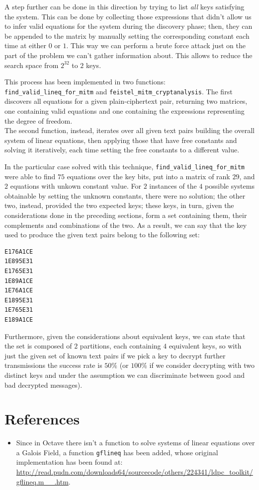 \documentclass[a4paper,12pt,titlepage]{article}
\begin{document}
A step further can be done in this direction by trying to list \emph{all} keys
satisfying the system. This can be done by
collecting those expressions that didn't allow us to infer valid equations for
the system during the discovery phase; then, they can be appended to the matrix by
manually setting the corresponding constant each time at either $0$ or $1$.
This way we can perform a brute force attack just on the part of the problem we
can't gather information about. This allows to reduce the search space from
$2^{32}$ to $2$ keys.

This process has been implemented in two functions:
\texttt{find\_valid\_lineq\_for\_mitm} and \texttt{feistel\_mitm\_cryptanalysis}. The
first discovers all equations for a given plain-ciphertext pair, returning two
matrices, one containing valid equations and one containing the expressions
representing the degree of freedom. \\
The second function, instead, iterates over all given text pairs building the
overall system of linear equations, then applying those that have free
constants and solving it iteratively, each time setting the free constants to a
different value.

In the particular case solved with this technique,
\texttt{find\_valid\_lineq\_for\_mitm} were able to find $75$ equations over the
key bits, put into a matrix of rank $29$, and $2$ equations with unkown
constant value. For $2$ instances of the $4$ possible systems obtainable by
setting the unknown constants, there were no solution; the other two, instead,
provided the two expected keys; these keys, in turn, given the considerations
done in the preceding sections, form a set containing them, their complements
and combinations of the two. As a result, we can say that the key used to produce the
given text pairs belong to the following set:
\begin{verbatim}
E176A1CE
1E895E31
E1765E31
1E89A1CE
1E76A1CE
E1895E31
1E765E31
E189A1CE
\end{verbatim}

Furthermore, given the considerations about equivalent keys, we can state that
the set is composed of $2$ partitions, each containing $4$ equivalent keys, so
with just the given set of known text pairs if we pick a key to decrypt further
transmissions the success rate is $50\%$ (or $100\%$ if we consider decrypting
with two distinct keys and under the assumption we can discriminate between
good and bad decrypted messages).

\section{References}
\begin{itemize}
  \item Since in Octave there isn't a function to solve systems of linear equations
        over a Galois Field, a function \texttt{gflineq} has been added, whose original
        implementation has been found at: \\
        \url{http://read.pudn.com/downloads64/sourcecode/others/224341/ldpc_toolkit/gflineq.m__.htm}.
\end{itemize}
\end{document}
